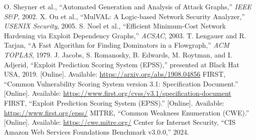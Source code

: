  O. Sheyner et al., ``Automated Generation and Analysis of Attack Graphs,'' \emph{IEEE S\&P}, 2002.
 X. Ou et al., ``MulVAL: A Logic-based Network Security Analyzer,'' \emph{USENIX Security}, 2005.
 S. Noel et al., ``Efficient Minimum-Cost Network Hardening via Exploit Dependency Graphs,'' \emph{ACSAC}, 2003.
 T. Lengauer and R. Tarjan, ``A Fast Algorithm for Finding Dominators in a Flowgraph,'' \emph{ACM TOPLAS}, 1979.
 J. Jacobs, S. Romanosky, B. Edwards, M. Roytman, and I. Adjerid, ``Exploit Prediction Scoring System (EPSS),'' presented at Black Hat USA, 2019. [Online]. Available: \url{https://arxiv.org/abs/1908.04856}
 FIRST, ``Common Vulnerability Scoring System version 3.1: Specification Document.'' [Online]. Available: \url{https://www.first.org/cvss/v3.1/specification-document}
 FIRST, ``Exploit Prediction Scoring System (EPSS).'' [Online]. Available: \url{https://www.first.org/epss/}
 MITRE, ``Common Weakness Enumeration (CWE).'' [Online]. Available: \url{https://cwe.mitre.org/}
 Center for Internet Security, ``CIS Amazon Web Services Foundations Benchmark v3.0.0,'' 2024.
